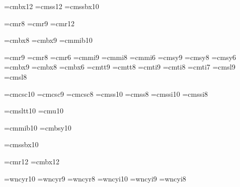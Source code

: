 
\font\bigbold=cmbx12
\font\bigsans=cmss12
\font\smallheader=cmssbx10 %

\font\eightpt=cmr8
\font\ninept=cmr9
\font\twelvept=cmr12

\font\eightbold=cmbx8
\font\ninebold=cmbx9
\font\mathbold=cmmib10

\font\ninerm=cmr9     \font\eightrm=cmr8   \font\sixrm=cmr6      %
\font\ninei=cmmi9     \font\eighti=cmmi8   \font\sixi=cmmi6      %
\font\ninesy=cmsy9    \font\eightsy=cmsy8  \font\sixsy=cmsy6     %
\font\ninebf=cmbx9    \font\eightbf=cmbx8  \font\sixbf=cmbx6     %
\font\ninett=cmtt9    \font\eighttt=cmtt8                        %
\font\nineit=cmti9    \font\eightit=cmti8  \font\sevenit=cmti7   %
\font\ninesl=cmsl9    \font\eightsl=cmsl8                        %

\font\tensc=cmcsc10   \font\ninesc=cmcsc9  \font\eightsc=cmcsc8  %
\font\tenss=cmss10    \font\eightssq=cmss8    %
\font\tenssi=cmssi10  \font\eightssqi=cmssi8  %

\font\tensltt=cmsltt10 %
\font\tenu=cmu10       %

\font\tenbi=cmmib10    %
\font\tenbsy=cmbsy10   %

\font\tenssbx=cmssbx10 %

\font\twelverm=cmr12  \font\twelvebf=cmbx12
\def\sc{\tensc}  \def\mc{\ninerm}


    \font\tencyr=wncyr10   \font\ninecyr=wncyr9   \font\eightcyr=wncyr8
    \font\tencyri=wncyi10  \font\ninecyri=wncyi9  \font\eightcyri=wncyi8
    \def\cyr{\tencyr\cyracc} \def\cyri{\tencyri\cyracc}

